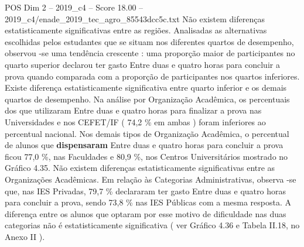 \begin{textsample}{POS Dim 2 – 2019\_c4 – Score 18.00 – 2019\_c4/enade\_2019\_tec\_agro\_85543dcc5c.txt}
Não existem diferenças estatisticamente significativas entre as regiões.
Analisadas as alternativas escolhidas pelos estudantes que se situam nos diferentes quartos de desempenho, observou -se uma tendência crescente : uma proporção maior de participantes no quarto superior declarou ter gasto Entre duas e quatro horas para concluir a prova quando comparada com a proporção de participantes nos quartos inferiores.
Existe diferença estatisticamente significativa entre quarto inferior e os demais quartos de desempenho.
Na análise por Organização Acadêmica, os percentuais dos que utilizaram Entre duas e quatro horas para finalizar a prova nas Universidades e nos CEFET/IF ( 74,2 \% em ambas ) foram inferiores ao percentual nacional.
Nos demais tipos de Organização Acadêmica, o percentual de alunos que \textbf{dispensaram} Entre duas e quatro horas para concluir a prova ficou 77,0 \%, nas Faculdades e 80,9 \%, nos Centros Universitários mostrado no Gráfico 4.35.
Não existem diferenças estatisticamente significativas entre as Organizações Acadêmicas.
Em relação às Categorias Administrativas, observa -se que, nas IES Privadas, 79,7 \% declararam ter gasto Entre duas e quatro horas para concluir a prova, sendo 73,8 \% nas IES Públicas com a mesma resposta.
A diferença entre os alunos que optaram por esse motivo de dificuldade nas duas categorias não é estatisticamente significativa ( ver Gráfico 4.36 e Tabela II.18, no Anexo II ).

\end{textsample}

